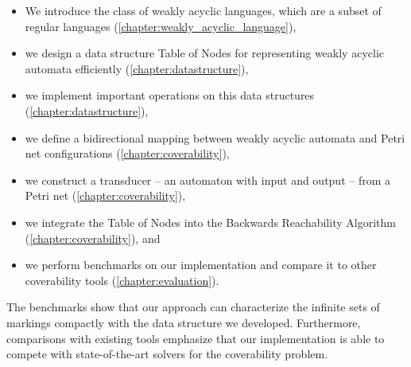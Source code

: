\begin{itemize}[-]
\setlength\itemsep{0.2em}
\item We introduce the class of weakly acyclic languages, which are a subset of regular languages (\autoref{chapter:weakly_acyclic_language}),
\item we design a data structure Table of Nodes for representing weakly acyclic automata efficiently (\autoref{chapter:datastructure}),
\item we implement important operations on this data structures (\autoref{chapter:datastructure}),
\item we define a bidirectional mapping between weakly acyclic automata and Petri net configurations (\autoref{chapter:coverability}),
\item we construct a transducer -- an automaton with input and output -- from a Petri net (\autoref{chapter:coverability}),
\item we integrate the Table of Nodes into the Backwards Reachability Algorithm (\autoref{chapter:coverability}), and
\item we perform benchmarks on our implementation and compare it to other coverability tools (\autoref{chapter:evaluation}).
\end{itemize}

The benchmarks show that our approach can characterize the infinite sets of markings compactly with the data structure we developed. Furthermore, comparisons with existing tools emphasize that our implementation is able to compete with state-of-the-art solvers for the coverability problem.